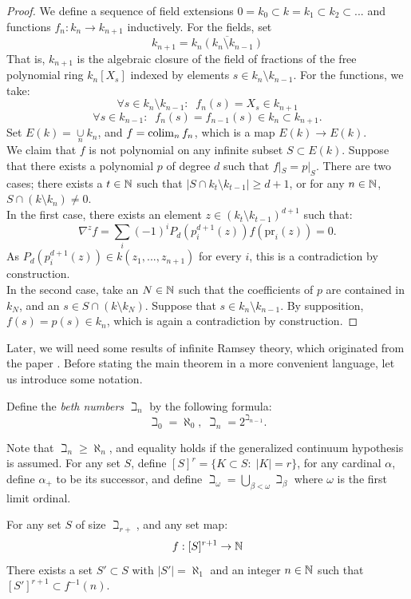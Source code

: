 \begin{proof}
We define a sequence of field extensions $0=k_0\subset k=k_1 \subset k_2 \subset ...$ and functions $f_{n}:k_n \to k_{n+1}$ inductively. For the fields, set 
\[k_{n+1} = \overline{k_{n}(k_{n} \setminus k_{n-1})}\]
That is, $k_{n+1}$ is the algebraic closure of the field of fractions of the free polynomial ring $k_{n}[X_s]$ indexed by elements $s \in k_{n} \setminus k_{n-1}$. For the functions, we take:
\[\forall s \in k_{n} \setminus k_{n-1}: \; \; f_n(s) = X_s \in k_{n+1}\]
\[\forall s \in k_{n-1}: \; \; f_n(s) = f_{n-1}(s) \in k_{n} \subset k_{n+1}.\]
Set $E(k) = \underset{n}{\cup} k_n$, and $f=\operatorname*{colim}_{n} f_n$, which is a map $E(k) \to E(k)$. \\
\indent We claim that $f$ is not polynomial on any infinite subset $S \subset E(k)$. Suppose that there exists a polynomial $p$ of degree $d$ such that $f|_{S} = p|_{S}$. There are two cases; there exists a $t \in \mathbb{N}$ such that $|S \cap k_t\setminus k_{t-1}| \ge d+1$, or for any $n \in \mathbb{N}$, $S \cap (k \setminus k_n) \neq 0$.\\
\indent In the first case, there exists an element $z \in (k_t \setminus k_{t-1})^{d+1}$ such that:
\[\nabla^z f = \sum_i (-1)^iP_d(p^{d+1}_i(z))f(\text{pr}_i(z))= 0.\]
As $P_d(p^{d+1}_i(z)) \in k(z_1,...,z_{n+1})$ for every $i$, this is a contradiction by construction.\\
\indent In the second case, take an $N \in \mathbb{N}$ such that the coefficients of $p$ are contained in $k_N$, and an $s \in S \cap (k \setminus k_N)$. Suppose that $s \in k_n\setminus k_{n-1}$. By supposition, $f(s) = p(s) \in k_n$, which is again a contradiction by construction.
\end{proof}
Later, we will need some results of infinite Ramsey theory, which originated from the paper \cite{ErdosRado}. Before stating the main theorem in a more convenient language, let us introduce some notation. 
\begin{construction}
Define the \textit{beth numbers} $\beth_n$ by the following formula:
\[\beth_0 = \aleph_0, \; \beth_n = 2^{\beth_{n-1}}.\]
\end{construction}
Note that $\beth_{n} \ge \aleph_{n}$, and equality holds if the generalized continuum hypothesis is assumed.
 For any set $S$, define $[S]^r=\{K \subset S: \; |K|=r\}$, for any cardinal $\alpha$, define $\alpha_{+}$ to be its 
 successor, and define $\beth_{\omega}=\bigcup_{\beta < \omega} \beth_{\beta}$ where $\omega$ is the first limit ordinal.
\begin{theorem}\label{theorem:erdosrado}
For any set $S$ of size $\beth_{r+}$, and any set map:
\[f: [S]^{r+1} \rightarrow \mathbb{N}\]
There exists a set $S' \subset S$ with $|S'|=\aleph_{1}$ and an integer $n \in \mathbb{N}$ such that $[S']^{r+1} \subset f^{-1}(n)$.
\end{theorem}
